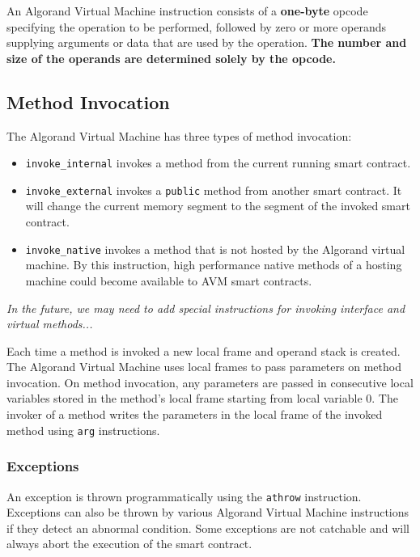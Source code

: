 \documentclass[11pt]{article}
\begin{document}
    An Algorand Virtual Machine instruction consists of a \textbf{one-byte} opcode specifying the operation to be
    performed,
    followed by zero or more operands supplying arguments or data that are used by the operation.
    \textbf{The number and size of the operands are determined solely by the opcode.}

    \subsection{Method Invocation}\label{subsec:method-invocation}

    The Algorand Virtual Machine has three types of method invocation:
    \begin{itemize}
        \item \texttt{invoke\_internal} invokes a method from the current running smart contract.
        \item \texttt{invoke\_external} invokes a \texttt{public} method from another smart contract.
        It will change the current memory segment to the segment of the invoked smart contract.
        \item \texttt{invoke\_native} invokes a method that is not hosted by the Algorand virtual machine.
        By this instruction, high performance native methods of a hosting machine could become available to AVM smart
        contracts.
    \end{itemize}

    \emph{In the future, we may need to add special instructions for invoking interface and virtual methods...}

    Each time a method is invoked a new local frame and operand stack is created.
    The Algorand Virtual Machine uses local frames to pass parameters on method invocation.
    On method invocation, any parameters are passed in consecutive local variables stored in the method's local frame
    starting from local variable 0.
    The invoker of a method writes the parameters in the local frame of the invoked method using \texttt{arg}
    instructions.

    \subsubsection{Exceptions}

    An exception is thrown programmatically using the \texttt{athrow} instruction.
    Exceptions can also be thrown by various Algorand Virtual Machine instructions if they detect an abnormal
    condition.
    Some exceptions are not catchable and will always abort the execution of the smart contract.
\end{document}
